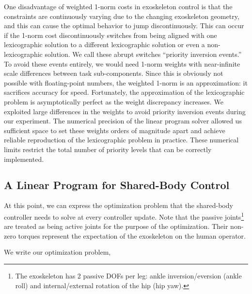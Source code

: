 \documentclass[utf8]{frontiersSCNS}
\newcommand{\add}[1]{\textcolor[HTML]{8710b3}{#1}}
\begin{document}
One disadvantage of weighted 1-norm costs in exoskeleton control is that the constraints are continuously varying due to the changing exoskeleton geometry, and this can cause the optimal behavior to jump discontinuously.
This can occur if the 1-norm cost discontinuously switches from being aligned with one lexicographic solution to a different lexicographic solution or even a non-lexicographic solution.
We call these abrupt switches ``priority inversion events.'' To avoid these events entirely, we would need 1-norm weights with near-infinite scale differences between task sub-components. Since this is obviously not possible with floating-point numbers, the weighted 1-norm is an approximation: it sacrifices accuracy for speed.
Fortunately, the approximation of the lexicographic problem is asymptotically perfect as the weight discrepancy increases.
\add{We exploited large differences in the weights to avoid priority inversion events during our experiment.}
The numerical precision of the linear program solver allowed us sufficient space to set these weights orders of magnitude apart and achieve reliable reproduction of the lexicographic problem in practice.
\add{These numerical limits restrict the total number of priority levels that can be correctly implemented.}




\subsection{A Linear Program for Shared-Body Control}

At this point, we can express the optimization problem that the shared-body controller needs to solve at every controller update.
Note that the passive joints\footnote{The exoskeleton has 2 passive DOFs per leg: ankle inversion/eversion (ankle roll) and internal/external rotation of the hip (hip yaw).} are treated as being active joints for the purpose of the optimization. Their non-zero torques represent the expectation of the exoskeleton on the human operator.


We write our optimization problem,
\end{document}
